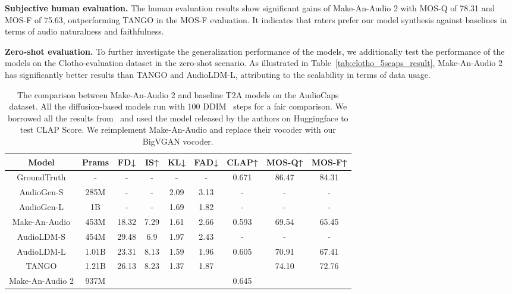 \documentclass{article}
\begin{document}
\textbf{Subjective human evaluation.}
The human evaluation results show significant gains of Make-An-Audio 2 with MOS-Q of 78.31 and MOS-F of 75.63, outperforming TANGO in the MOS-F evaluation. It indicates that raters prefer our model synthesis against baselines in terms of audio naturalness and faithfulness. 



\textbf{Zero-shot evaluation.} 
To further investigate the generalization performance of the models, we additionally test the performance of the models on the Clotho-evaluation dataset in the zero-shot scenario. As illustrated in Table~\ref{tab:clotho_5scaps_result}, Make-An-Audio 2 has significantly better results than TANGO and AudioLDM-L, attributing to the scalability in terms of data usage. 


\begin{table*}[]
\centering
\caption{The comparison between Make-An-Audio 2 and baseline T2A models on the AudioCaps dataset. All the diffusion-based models run with 100 DDIM~\cite{ddim} steps for a fair comparison. We borrowed all the results from~\cite{liuAudioLDMTexttoAudioGeneration2023,ghosal2023texttoaudio} and used the model released by the authors on Huggingface to test CLAP Score. We reimplement Make-An-Audio and replace their vocoder with our BigVGAN vocoder. }
\vspace{2mm}
\small
\begin{tabular}{ccccccccc}
\toprule
Model  & Prams  & FD↓    & IS↑    & KL↓    & FAD↓   & CLAP↑  & MOS-Q↑ & MOS-F↑ \\
\midrule
GroundTruth & -   & -      & -      & -   & -   & 0.671   &  86.47     & 84.31  \\
AudioGen-S & 285M   & -      & -      & 2.09   & 3.13   & -      & -      & -  \\
AudioGen-L & 1B     & -      & -      & 1.69   & 1.82   & -      & -      & -  \\
Make-An-Audio & 453M   & 18.32  & 7.29   & 1.61   & 2.66   & 0.593  &  69.54    & 65.45  \\
AudioLDM-S & 454M   & 29.48  & 6.9    & 1.97   & 2.43   &  -     & -      & - \\
AudioLDM-L & 1.01B   & 23.31  & 8.13   & 1.59   & 1.96   & 0.605   &  70.91      & 67.41 \\
TANGO  & 1.21B   & 26.13  & 8.23   & 1.37   & 1.87   &   &  74.10   & 72.76 \\
\midrule
Make-An-Audio 2 & 937M   &   &   &     &    &  0.645      &        &  \\
\bottomrule
\end{tabular}\label{tab:comp}\end{table*}
\end{document}
